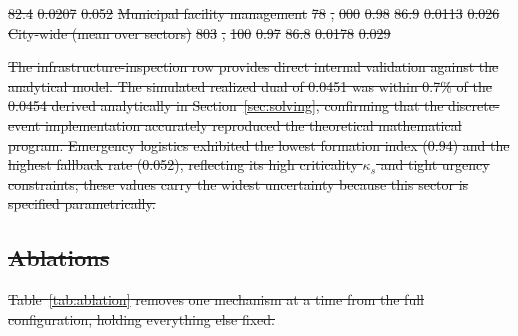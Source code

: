 \documentclass[utf8]{FrontiersinHarvard}
\providecommand{\DIFdel}[1]{{\protect\color{red}\sout{#1}}}                      %
\providecommand{\DIFdelFL}[1]{\DIFdel{#1}} %
\begin{document}
\DIFdelFL{82.4 }%
\DIFdelFL{0.0207 }%
\DIFdelFL{0.052}%
\DIFdelFL{Municipal facility management }%
\DIFdelFL{78}%
\DIFdelFL{,}%
\DIFdelFL{000 }%
\DIFdelFL{0.98 }%
\DIFdelFL{86.9 }%
\DIFdelFL{0.0113 }%
\DIFdelFL{0.026}%
\DIFdelFL{City-wide (mean over sectors) }%
\DIFdelFL{803}%
\DIFdelFL{,}%
\DIFdelFL{100 }%
\DIFdelFL{0.97 }%
\DIFdelFL{86.8 }%
\DIFdelFL{0.0178 }%
\DIFdelFL{0.029}%

\DIFdel{The infrastructure-inspection row provides direct internal validation against the analytical model. The simulated realized dual of 0.0451 was within 0.7\% of the 0.0454 derived analytically in Section~\ref{sec:solving}, confirming that the discrete-event implementation accurately reproduced the theoretical mathematical program. Emergency logistics exhibited the lowest formation index (0.94) and the highest fallback rate (0.052), reflecting its high criticality $\kappa_s$ and tight urgency constraints; these values carry the widest uncertainty because this sector is specified parametrically.
	}%


\subsection{\DIFdel{Ablations}}
\addtocounter{subsection}{-1}%

\DIFdel{Table~\ref{tab:ablation} removes one mechanism at a time from the full configuration, holding everything else fixed.
	}%
\end{document}
